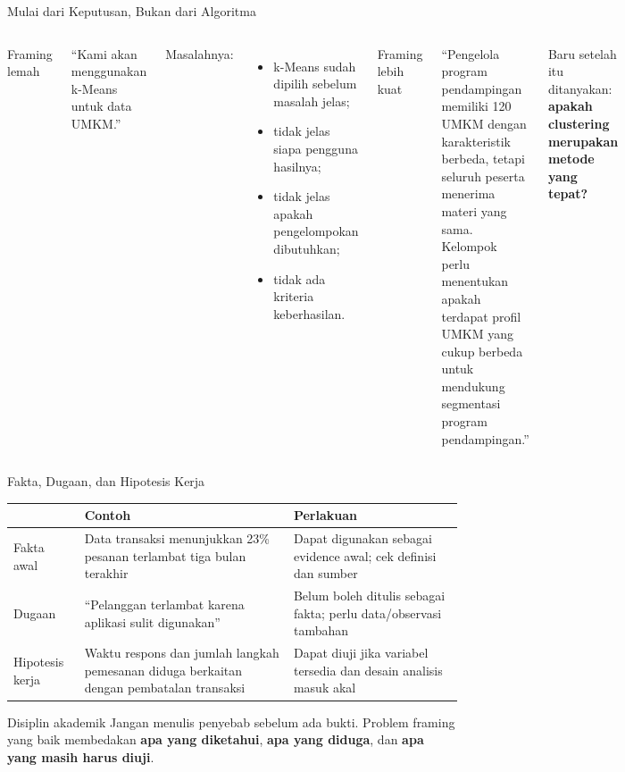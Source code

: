 \documentclass[aspectratio=169,11pt]{beamer}
\begin{document}
\begin{frame}{Mulai dari Keputusan, Bukan dari Algoritma}
\begin{columns}[T]
\begin{alertblock}{Framing lemah}\end{alertblock}
\vspace{1mm}
\footnotesize
``Kami akan menggunakan k-Means untuk data UMKM.''

\vspace{4mm}
Masalahnya:
\begin{itemize}
  \item k-Means sudah dipilih sebelum masalah jelas;
  \item tidak jelas siapa pengguna hasilnya;
  \item tidak jelas apakah pengelompokan dibutuhkan;
  \item tidak ada kriteria keberhasilan.
\end{itemize}

\begin{block}{Framing lebih kuat}\end{block}
\vspace{1mm}
\footnotesize
``Pengelola program pendampingan memiliki 120 UMKM dengan karakteristik berbeda, tetapi seluruh peserta menerima materi yang sama. Kelompok perlu menentukan apakah terdapat profil UMKM yang cukup berbeda untuk mendukung segmentasi program pendampingan.''

\vspace{2mm}
Baru setelah itu ditanyakan: \textbf{apakah clustering merupakan metode yang tepat?}
\end{columns}
\end{frame}

\begin{frame}{Fakta, Dugaan, dan Hipotesis Kerja}
\small
\begin{center}
\begin{tabular}{p{3.1cm} p{4.8cm} p{5.4cm}}
\toprule
 & \textbf{Contoh} & \textbf{Perlakuan} \\
\midrule
Fakta awal & Data transaksi menunjukkan 23\% pesanan terlambat tiga bulan terakhir & Dapat digunakan sebagai evidence awal; cek definisi dan sumber \\
Dugaan & ``Pelanggan terlambat karena aplikasi sulit digunakan'' & Belum boleh ditulis sebagai fakta; perlu data/observasi tambahan \\
Hipotesis kerja & Waktu respons dan jumlah langkah pemesanan diduga berkaitan dengan pembatalan transaksi & Dapat diuji jika variabel tersedia dan desain analisis masuk akal \\
\bottomrule
\end{tabular}
\end{center}

\begin{alertblock}{Disiplin akademik}
\footnotesize
Jangan menulis penyebab sebelum ada bukti. Problem framing yang baik membedakan \textbf{apa yang diketahui}, \textbf{apa yang diduga}, dan \textbf{apa yang masih harus diuji}.
\end{alertblock}
\end{frame}
\end{document}
